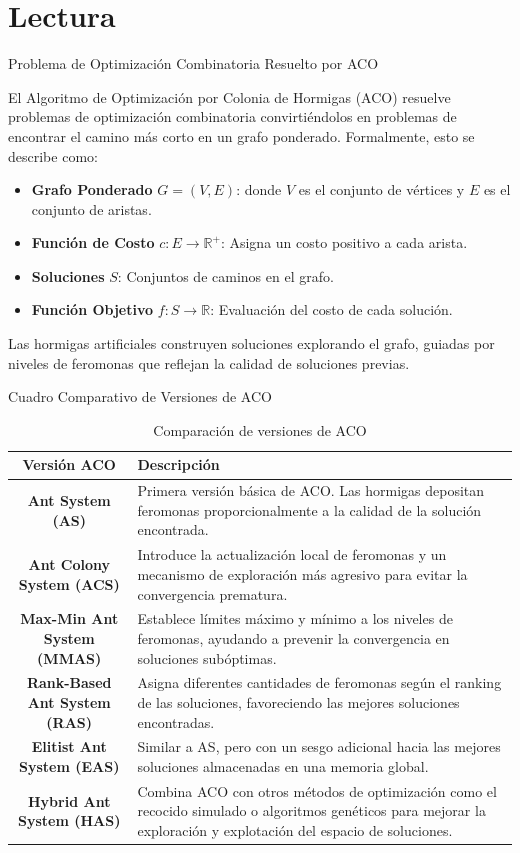 \documentclass{report}
\begin{document}
\section{Lectura}
Problema de Optimización Combinatoria Resuelto por ACO

El Algoritmo de Optimización por Colonia de Hormigas (ACO) resuelve problemas de optimización combinatoria convirtiéndolos en problemas de encontrar el camino más corto en un grafo ponderado. Formalmente, esto se describe como:

\begin{itemize}
    \item \textbf{Grafo Ponderado} \(G = (V, E)\): donde \(V\) es el conjunto de vértices y \(E\) es el conjunto de aristas.
    \item \textbf{Función de Costo} \(c: E \rightarrow \mathbb{R}^+\): Asigna un costo positivo a cada arista.
    \item \textbf{Soluciones} \(S\): Conjuntos de caminos en el grafo.
    \item \textbf{Función Objetivo} \(f: S \rightarrow \mathbb{R}\): Evaluación del costo de cada solución.
\end{itemize}

Las hormigas artificiales construyen soluciones explorando el grafo, guiadas por niveles de feromonas que reflejan la calidad de soluciones previas.

Cuadro Comparativo de Versiones de ACO

\begin{table}[h!]
\centering
\begin{tabular}{|c|p{10cm}|}
\hline
\textbf{Versión ACO} & \textbf{Descripción} \\
\hline
\textbf{Ant System (AS)} & Primera versión básica de ACO. Las hormigas depositan feromonas proporcionalmente a la calidad de la solución encontrada. \\
\hline
\textbf{Ant Colony System (ACS)} & Introduce la actualización local de feromonas y un mecanismo de exploración más agresivo para evitar la convergencia prematura. \\
\hline
\textbf{Max-Min Ant System (MMAS)} & Establece límites máximo y mínimo a los niveles de feromonas, ayudando a prevenir la convergencia en soluciones subóptimas. \\
\hline
\textbf{Rank-Based Ant System (RAS)} & Asigna diferentes cantidades de feromonas según el ranking de las soluciones, favoreciendo las mejores soluciones encontradas. \\
\hline
\textbf{Elitist Ant System (EAS)} & Similar a AS, pero con un sesgo adicional hacia las mejores soluciones almacenadas en una memoria global. \\
\hline
\textbf{Hybrid Ant System (HAS)} & Combina ACO con otros métodos de optimización como el recocido simulado o algoritmos genéticos para mejorar la exploración y explotación del espacio de soluciones. \\
\hline
\end{tabular}
\caption{Comparación de versiones de ACO}
\end{table}
\end{document}
